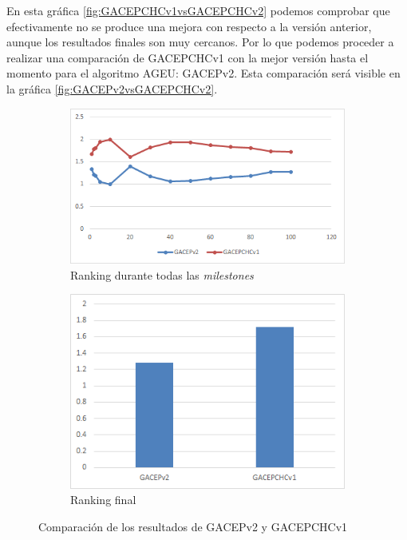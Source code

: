 En esta gráfica \ref{fig:GACEPCHCv1vsGACEPCHCv2} podemos comprobar que efectivamente no se produce una mejora con respecto a la versión anterior, aunque los resultados finales son muy cercanos. 
Por lo que podemos proceder a realizar una comparación de GACEPCHCv1 con la mejor versión hasta el momento para el algoritmo AGEU: GACEPv2. 
Esta comparación será visible en la gráfica \ref{fig:GACEPv2vsGACEPCHCv2}.

\begin{figure}[h]
     \centering
     \begin{subfigure}[b]{0.45\textwidth}
         \centering
         \includegraphics[width=\textwidth]{imagenes/Experimental/GACEPv2vsGACEPCHCv1.png}
         \caption{Ranking durante todas las \textit{milestones}}
         \label{fig:GACEPv2vsGACEPCHCv1_lineas}
     \end{subfigure}
     \hfill
     \begin{subfigure}[b]{0.45\textwidth}
         \centering
         \includegraphics[width=\textwidth]{imagenes/Experimental/barras/GACEPv2vsGACEPCHCv1.png}
         \caption{Ranking final}
         \label{fig:GACEPv2vsGACEPCHCv1_barras}
     \end{subfigure}
        \caption{Comparación de los resultados de GACEPv2 y GACEPCHCv1}
        \label{fig:GACEPv2vsGACEPCHCv1}
\end{figure}

